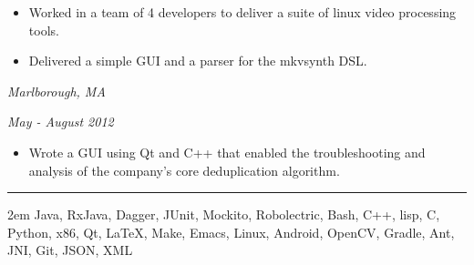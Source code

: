\documentclass[10pt]{article}
\newcommand{\headskip}{\vspace{.075in}}
\newenvironment{compactitemize} {
  \begin{itemize}[rightmargin=.25in, topsep=0pt]
    \setlength{\itemsep}{0pt}
    \setlength{\parsep}{0pt}
    \setlength{\parskip}{0pt}
} {
  \end{itemize}
}
\begin{document}
\begin{compactitemize}
\item Worked in a team of 4 developers to deliver a suite of linux
  video processing tools.
\item Delivered a simple GUI and a parser for the mkvsynth DSL.
\end{compactitemize}

\hfill \emph{Marlborough, MA}

 \hfill \emph{May - August 2012}

\begin{compactitemize}
\item Wrote a GUI using Qt and C++ that enabled the
troubleshooting and analysis of the company's core deduplication algorithm.
\end{compactitemize}

 \vspace{.05in} \hrule
\headskip

\par
\begingroup
\leftskip2em
\rightskip\leftskip
\noindent Java, RxJava, Dagger, JUnit, Mockito, Robolectric, Bash,
C++, lisp, C, Python, x86, Qt, \LaTeX, Make, Emacs, Linux, Android,
OpenCV, Gradle, Ant, JNI, Git, JSON, XML
\par
\endgroup
\end{document}
